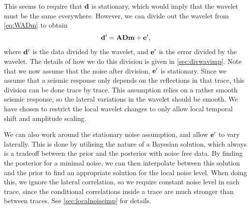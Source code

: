 This seems to require that $\mathbf{d}$ is stationary, which would imply
that the wavelet must be the same everywhere. However, we can divide
out the wavelet from \autoref{eq:WADm} to obtain 
\begin{equation}
\label{eq:ADm}
\mathbf{d^\prime} = \mathbf{A}\mathbf{D}\mathbf{m} + \mathbf{e^\prime},
\end{equation}
where $\mathbf{d^\prime}$ is the data divided by the wavelet, and
$\mathbf{e^\prime}$ is the error divided by the wavelet. The details of
how we do this division is given in \autoref{sec:divwavimp}. Note that
we now assume that the noise after division, $\mathbf{e^\prime}$ is
stationary. Since we assume that a seismic response only depends on
the reflections in that trace, this division can be done trace by
trace. This assumption relies on a rather smooth seismic response, so
the lateral variations in the wavelet should be smooth. We have chosen
to restrict the local wavelet changes to only allow local temporal
shift and amplitude scaling. 

We can also work around the stationary noise assumption, and allow
$\mathbf{e^\prime}$ to vary laterally. This is done by utilising the
nature of a Bayesian solution, which always is a tradeoff between the
prior and the posterior with noise free data. By finding the posterior
for a minimal noise, we can then interpolate between this solution and
the prior to find an appropriate solution for the local noise
level. When doing this, we ignore the lateral correlation, so we
require constant noise level in each trace, since the conditional
correlations inside a trace are much stronger than between traces. See
\autoref{sec:localnoiseimp} for details. 

